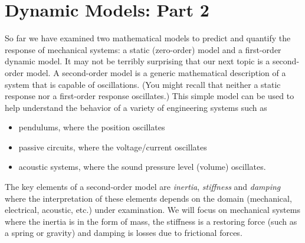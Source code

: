 \chapter{Dynamic Models: Part 2}\label{c:model2}
So far we have examined two mathematical models to predict and quantify the response of mechanical systems: a static (zero-order) model and a first-order dynamic model.  It may not be terribly surprising that our next topic is a second-order model.  A second-order model is a generic mathematical description of a system that is capable of oscillations. (You might recall that neither a static response nor a first-order response oscillates.)   This simple model can be used to help understand the behavior of a variety of engineering systems such as
\begin{itemize}
\item pendulums, where the position oscillates
\item passive circuits, where the voltage/current oscillates 
\item acoustic systems, where the sound pressure level (volume) oscillates.
\end{itemize}

The key elements of a second-order model are \emph{inertia}, \emph{stiffness} and \emph{damping} where the interpretation of these elements depends on the domain (mechanical, electrical, acoustic, etc.) under examination.  We will focus on mechanical systems where the inertia is in the form of mass, the stiffness is a restoring force (such as a spring or gravity) and damping is losses due to frictional forces.


